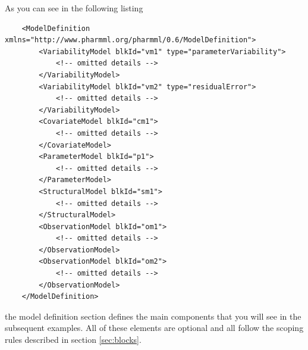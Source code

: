 As you can see in the following listing 
\lstset{language=XML}
\begin{lstlisting}
    <ModelDefinition xmlns="http://www.pharmml.org/pharmml/0.6/ModelDefinition">
        <VariabilityModel blkId="vm1" type="parameterVariability">
            <!-- omitted details -->
        </VariabilityModel>
        <VariabilityModel blkId="vm2" type="residualError">
            <!-- omitted details -->
        </VariabilityModel>
        <CovariateModel blkId="cm1">
            <!-- omitted details -->
        </CovariateModel>
        <ParameterModel blkId="p1">
            <!-- omitted details -->
        </ParameterModel>
        <StructuralModel blkId="sm1">
            <!-- omitted details -->
        </StructuralModel>
        <ObservationModel blkId="om1">
            <!-- omitted details -->
        </ObservationModel>
        <ObservationModel blkId="om2">
            <!-- omitted details -->
        </ObservationModel>
    </ModelDefinition>
\end{lstlisting}
the model definition section defines the main components that you will see in
the subsequent examples. All of these elements are optional and all follow the 
scoping rules described in section \ref{sec:blocks}.


